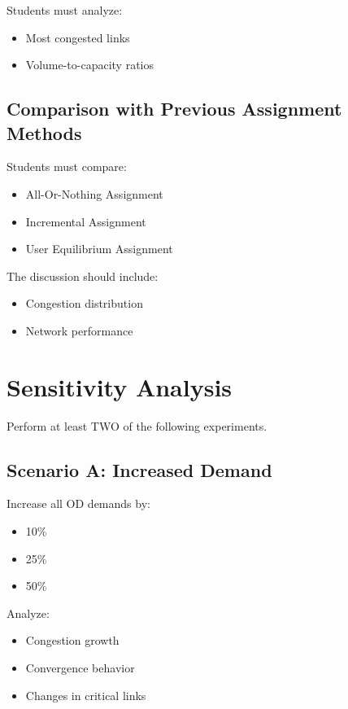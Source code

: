 \documentclass{rapportCS} %
\begin{document}
Students must analyze:

\begin{itemize}
    \item Most congested links
    \item Volume-to-capacity ratios
\end{itemize}

\subsection{Comparison with Previous Assignment Methods}

Students must compare:

\begin{itemize}
    \item All-Or-Nothing Assignment
    \item Incremental Assignment
    \item User Equilibrium Assignment
\end{itemize}

The discussion should include:

\begin{itemize}
    \item Congestion distribution
    \item Network performance
\end{itemize}

\section{Sensitivity Analysis}

Perform at least TWO of the following experiments.

\subsection{Scenario A: Increased Demand}

Increase all OD demands by:

\begin{itemize}
    \item 10\%
    \item 25\%
    \item 50\%
\end{itemize}

Analyze:
\begin{itemize}
    \item Congestion growth
    \item Convergence behavior
    \item Changes in critical links
\end{itemize}
\end{document}

